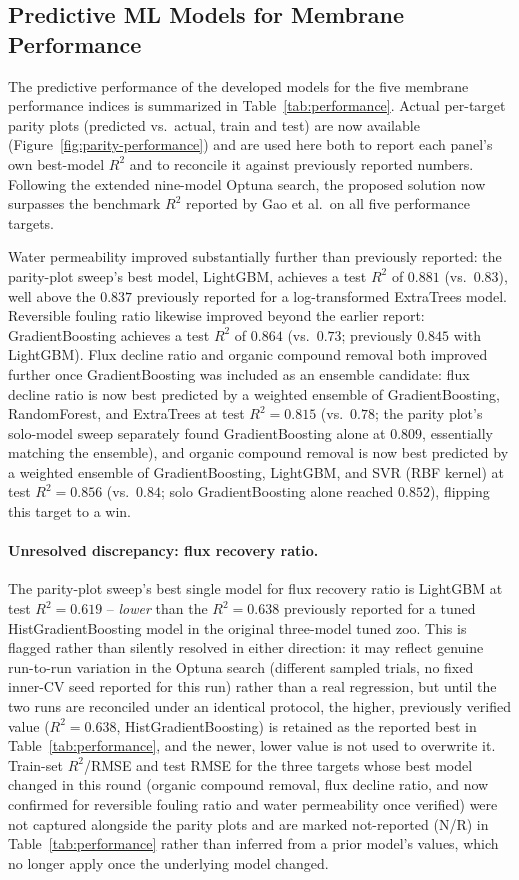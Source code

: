 \documentclass[11pt]{article}
\begin{document}
\subsection{Predictive ML Models for Membrane Performance}

The predictive performance of the developed models for the five membrane performance indices is summarized in Table~\ref{tab:performance}. Actual per-target parity plots (predicted vs.\ actual, train and test) are now available (Figure~\ref{fig:parity-performance}) and are used here both to report each panel's own best-model $R^2$ and to reconcile it against previously reported numbers. Following the extended nine-model Optuna search, the proposed solution now surpasses the benchmark $R^2$ reported by Gao et al.\ on all five performance targets.

Water permeability improved substantially further than previously reported: the parity-plot sweep's best model, LightGBM, achieves a test $R^2$ of $0.881$ (vs.\ $0.83$), well above the $0.837$ previously reported for a log-transformed ExtraTrees model. Reversible fouling ratio likewise improved beyond the earlier report: GradientBoosting achieves a test $R^2$ of $0.864$ (vs.\ $0.73$; previously $0.845$ with LightGBM). Flux decline ratio and organic compound removal both improved further once GradientBoosting was included as an ensemble candidate: flux decline ratio is now best predicted by a weighted ensemble of GradientBoosting, RandomForest, and ExtraTrees at test $R^2 = 0.815$ (vs.\ $0.78$; the parity plot's solo-model sweep separately found GradientBoosting alone at $0.809$, essentially matching the ensemble), and organic compound removal is now best predicted by a weighted ensemble of GradientBoosting, LightGBM, and SVR (RBF kernel) at test $R^2 = 0.856$ (vs.\ $0.84$; solo GradientBoosting alone reached $0.852$), flipping this target to a win.

\paragraph{Unresolved discrepancy: flux recovery ratio.} The parity-plot sweep's best single model for flux recovery ratio is LightGBM at test $R^2 = 0.619$ -- \emph{lower} than the $R^2 = 0.638$ previously reported for a tuned HistGradientBoosting model in the original three-model tuned zoo. This is flagged rather than silently resolved in either direction: it may reflect genuine run-to-run variation in the Optuna search (different sampled trials, no fixed inner-CV seed reported for this run) rather than a real regression, but until the two runs are reconciled under an identical protocol, the higher, previously verified value ($R^2 = 0.638$, HistGradientBoosting) is retained as the reported best in Table~\ref{tab:performance}, and the newer, lower value is not used to overwrite it. Train-set $R^2$/RMSE and test RMSE for the three targets whose best model changed in this round (organic compound removal, flux decline ratio, and now confirmed for reversible fouling ratio and water permeability once verified) were not captured alongside the parity plots and are marked not-reported (N/R) in Table~\ref{tab:performance} rather than inferred from a prior model's values, which no longer apply once the underlying model changed.
\end{document}
